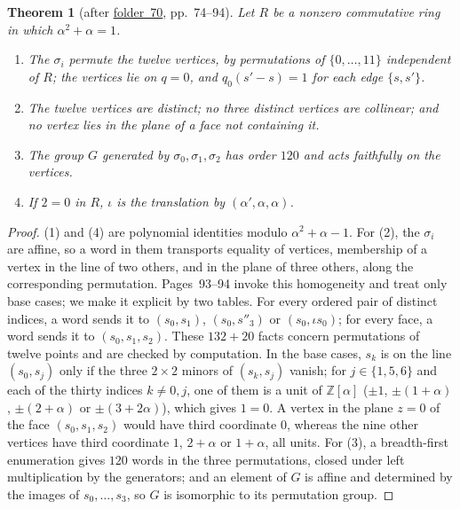 \documentclass[11pt,a4paper]{amsart}
\newtheorem{theorem}{Theorem}[section]
\theoremstyle{definition}
\theoremstyle{remark}
\newcommand{\Z}{\mathbb Z}
\newcommand{\fac}[1]{\href{https://grothendieck.umontpellier.fr/#1.pdf}{folder~#1}}
\begin{document}
\begin{theorem}[after \fac{70}, pp.~74--94]\label{thm:faithful}
Let $R$ be a nonzero commutative ring in which $\alpha^2 + \alpha = 1$.
\begin{enumerate}
\item The $\sigma_i$ permute the twelve vertices, by permutations of $\{0, \dots, 11\}$ independent of $R$; the vertices lie on $q = 0$, and $q_0(s' - s) = 1$ for each edge $\{s, s'\}$.
\item The twelve vertices are distinct; no three distinct vertices are collinear; and no vertex lies in the plane of a face not containing it.
\item The group $G$ generated by $\sigma_0, \sigma_1, \sigma_2$ has order $120$ and acts faithfully on the vertices.
\item If $2 = 0$ in $R$, $\iota$ is the translation by $(\alpha', \alpha, \alpha)$.
\end{enumerate}
\end{theorem}

\begin{proof}
(1) and (4) are polynomial identities modulo $\alpha^2 + \alpha - 1$. For (2), the $\sigma_i$ are affine, so a word in them transports equality of vertices, membership of a vertex in the line of two others, and in the plane of three others, along the corresponding permutation. Pages~93--94 invoke this homogeneity and treat only base cases; we make it explicit by two tables. For every ordered pair of distinct indices, a word sends it to $(s_0, s_1)$, $(s_0, s''_3)$ or $(s_0, \iota s_0)$; for every face, a word sends it to $(s_0, s_1, s_2)$. These $132 + 20$ facts concern permutations of twelve points and are checked by computation. In the base cases, $s_k$ is on the line $(s_0, s_j)$ only if the three $2 \times 2$ minors of $(s_k, s_j)$ vanish; for $j \in \{1, 5, 6\}$ and each of the thirty indices $k \ne 0, j$, one of them is a unit of $\Z[\alpha]$ ($\pm1$, $\pm(1+\alpha)$, $\pm(2+\alpha)$ or $\pm(3+2\alpha)$), which gives $1 = 0$. A vertex in the plane $z = 0$ of the face $(s_0, s_1, s_2)$ would have third coordinate $0$, whereas the nine other vertices have third coordinate $1$, $2 + \alpha$ or $1 + \alpha$, all units. For (3), a breadth-first enumeration gives $120$ words in the three permutations, closed under left multiplication by the generators; and an element of $G$ is affine and determined by the images of $s_0, \dots, s_3$, so $G$ is isomorphic to its permutation group.
\end{proof}
\end{document}
